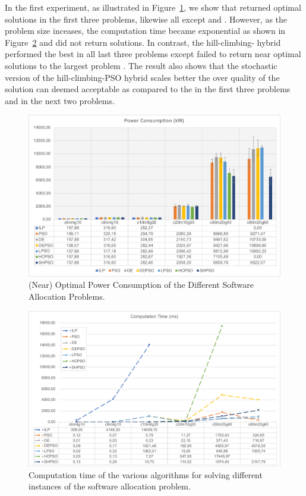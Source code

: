In the first experiment, as illustrated in Figure~\ref{fig_powerconsumption_ilp_metaheuristic}, we show that \ilp returned optimal solutions in the first three problems, likewise all except \pso{} and \depso{}. However, as the problem size inceases, the computation time became exponential as shown in Figure~\ref{fig_allocationtime_ilp_metaheuristic} and did not return solutions. In contrast, the hill-climbing-\pso{} hybrid performed the best in all last three problems except \hcpso{} failed to return near optimal solutions to the largest problem . The result also shows that the stochastic version of the hill-climbing-PSO hybrid \shpso{} scales better the over quality of the solution can deemed acceptable as compared to the \ilp{} in the first three problems and \hcpso{} in the next two problems. 
\begin{figure}
	\centering
	\includegraphics[width=0.8\linewidth]{images/power_consumption.pdf}
	\caption{(Near) Optimal Power Consumption of the Different Software Allocation Problems.}
	\label{fig_powerconsumption_ilp_metaheuristic}\vspace{-0.4cm}
\end{figure}

\begin{figure}
	\centering
	\includegraphics[width=0.8\linewidth]{images/time_summary.pdf}
	\caption{Computation time of the various algorithms for solving different instances of the software allocation problem.}
	\label{fig_allocationtime_ilp_metaheuristic}\vspace{-0.4cm}
\end{figure}

